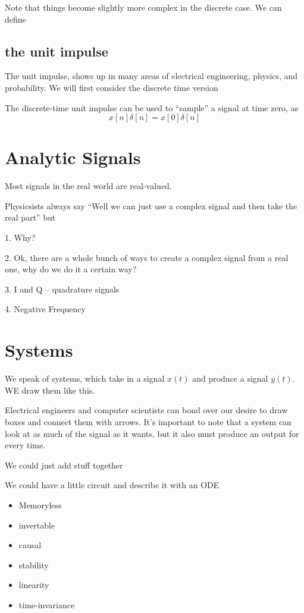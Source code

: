 Note that things become slightly more complex in the discrete case. We can
define

\subsection{the unit impulse}
The unit impulse, shows up in many areas of electrical
engineering, physics, and probability. We will first consider the 
discrete time version

The discrete-time unit impulse can be used to ``sample'' a signal
at time zero, as
\[
x[n]\delta[n] = x[0]\delta[n]
\]


\section{Analytic Signals}
Most signals in the real world are real-valued. 

Physicsists always say ``Well we can just use a complex signal and
then take the real part'' but

1. Why? 

2. Ok, there are a whole bunch of ways to create a complex signal from
a real one, why do we do it a certain way? 

3. I and Q -- quadrature signals

4. Negative Frequency

\section{Systems}

We speak of systems, which take in a signal $x(t)$ and produce a signal $y(t)$. WE
draw them like this. 

Electrical engineers and computer scientists can bond over our desire
to draw boxes and connect them with arrows. It's important to note that
a system can look at as much of the signal as it wants, but it also
must produce an output for every time. 

We could just add stuff together

We could have a little circuit and describe it with an ODE

\begin{itemize}
\item Memoryless 
\item invertable
\item causal
\item stability 
\item linearity
\item time-invariance 
\end{itemize}

